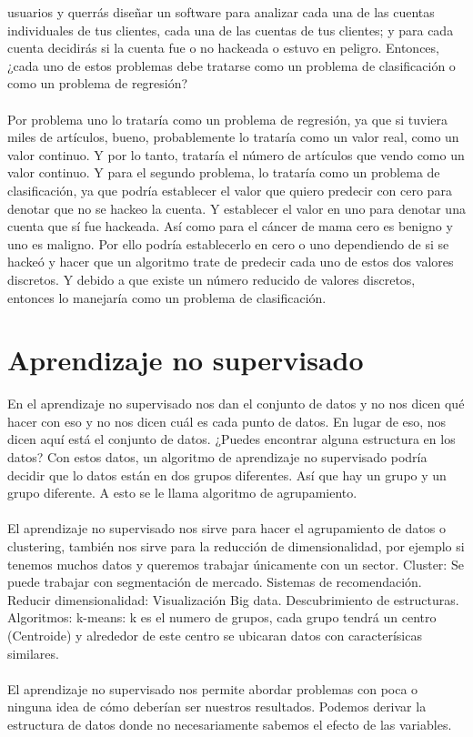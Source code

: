\documentclass{book}
\begin{document}
usuarios y querrás diseñar un software para analizar cada una de las
cuentas individuales de tus clientes, cada una de las cuentas de tus clientes; y para cada cuenta
decidirás si la cuenta fue o no hackeada o estuvo en peligro. Entonces, ¿cada uno
de estos problemas debe tratarse como un problema de clasificación o
como un problema de regresión? \\\\ Por problema uno lo trataría como un
problema de regresión, ya que si tuviera miles de artículos, bueno,
probablemente lo trataría como un valor real, como un valor continuo. Y
por lo tanto, trataría el número de artículos que vendo como un valor continuo. Y para el
segundo problema, lo trataría como un problema de clasificación, ya que podría
establecer el valor que quiero predecir con cero para denotar que no se hackeo
la cuenta. Y establecer el valor en uno para denotar una cuenta que sí fue hackeada. Así
como para el cáncer de mama cero es benigno y uno es maligno. Por ello
podría establecerlo en cero o uno dependiendo de si se hackeó y hacer que un
algoritmo trate de predecir cada uno de estos dos valores discretos. Y debido a que existe
un número reducido de valores discretos, entonces lo manejaría como un problema de
clasificación.
\newpage
\section{Aprendizaje no supervisado}
En el aprendizaje no supervisado nos dan el conjunto de datos
y no nos dicen qué
hacer con eso y no nos
dicen cuál es cada punto de datos.
En lugar de eso, nos dicen aquí está el conjunto de datos.
¿Puedes encontrar alguna estructura en los datos?
Con estos datos, un
algoritmo de aprendizaje no supervisado podría decidir
que lo datos están en dos grupos diferentes.
Así que hay un grupo
y un grupo diferente.
A esto se le llama algoritmo de agrupamiento.\\\\
El aprendizaje no supervisado nos sirve para hacer el agrupamiento de datos o clustering, también nos sirve para la reducción de dimensionalidad, por ejemplo si tenemos muchos datos y queremos trabajar únicamente con un sector.
Cluster: Se puede trabajar con segmentación de mercado. Sistemas de recomendación.
Reducir dimensionalidad: Visualización Big data. Descubrimiento de estructuras.
Algoritmos:
k-means: k es el numero de grupos, cada grupo tendrá un centro (Centroide) y alrededor de este centro se ubicaran datos con caracterísicas similares.
\\\\
El aprendizaje no supervisado nos permite abordar problemas con poca o ninguna idea de cómo deberían ser nuestros resultados. Podemos derivar la estructura de datos donde no necesariamente sabemos el efecto de las variables.
\end{document}
